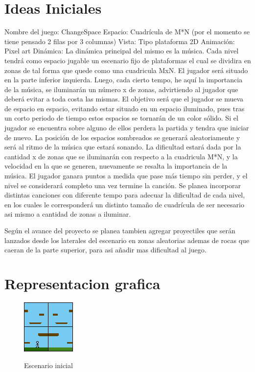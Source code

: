 \documentclass{article}
\begin{document}
\section{Ideas Iniciales}\label{Ideas}
Nombre del juego: ChangeSpace \newline Espacio: Cuadrícula de M*N (por el momento se tiene pensado 2 filas por 3 columnas) \newline Vista: Tipo plataforma 2D \newline Animación: Pixel art \newline Dinámica: La dinámica principal del mismo es la música. Cada nivel tendrá como espacio jugable un escenario fijo de plataformas el cual se dividira en zonas de tal forma que quede como una cuadricula MxN.  El jugador será situado en la parte inferior izquierda. Luego, cada cierto tempo, he aquí la importancia de la música, se iluminarán un número x de zonas, advirtiendo al jugador que deberá evitar a toda costa las mismas. El objetivo será que el jugador se mueva de espacio en espacio, evitando estar situado en un espacio iluminado, pues tras un corto periodo de tiempo estos espacios se tornarán de un color sólido. Si el jugador se encuentra sobre alguno de ellos perdera la partida y tendra que iniciar de nuevo. La posición de los espacios sombreados se generará aleatoriamente y será al ritmo de la música que estará sonando. La dificultad estará dada por la cantidad x de zonas que se iluminarán con respecto a la cuadricula M*N, y la velocidad en la que se generen, nuevamente se resalta la importancia de la música. El jugador ganara puntos a medida que pase más tiempo sin perder, y el nivel se considerará completo una vez termine la canción. \newline Se planea incorporar distintas canciones con diferente tempo para adecuar la dificultad de cada nivel, en los cuales le corresponderá un distinto tamaño de cuadrícula de ser necesario asi mismo a cantidad de zonas a iluminar.

Según el avance del proyecto se planea tambien agregar proyectiles que serán lanzados desde los laterales del escenario en zonas aleatorias ademas de rocas que caeran de la parte superior, para asi añadir mas dificultad al juego.



\section{Representacion grafica}\label{Video}
\begin{figure}[h]
    \centering
    \caption{Escenario inicial}
    \includegraphics{sprite_0.png}
    \label{fig:my_label}
\end{figure}
\end{document}
